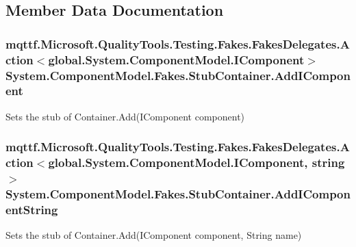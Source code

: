 \subsection{Member Data Documentation}
\hypertarget{class_system_1_1_component_model_1_1_fakes_1_1_stub_container_a74da74e37c7b42231abe4fbb2668ccfd}{
\subsubsection[{Add\-I\-Component}]{\setlength{\rightskip}{0pt plus 5cm}mqttf.\-Microsoft.\-Quality\-Tools.\-Testing.\-Fakes.\-Fakes\-Delegates.\-Action$<$global.\-System.\-Component\-Model.\-I\-Component$>$ System.\-Component\-Model.\-Fakes.\-Stub\-Container.\-Add\-I\-Component}}\label{class_system_1_1_component_model_1_1_fakes_1_1_stub_container_a74da74e37c7b42231abe4fbb2668ccfd}


Sets the stub of Container.\-Add(\-I\-Component component)

\hypertarget{class_system_1_1_component_model_1_1_fakes_1_1_stub_container_adbf5a2b9e27d72520b9c5940fd59ca5a}{
\subsubsection[{Add\-I\-Component\-String}]{\setlength{\rightskip}{0pt plus 5cm}mqttf.\-Microsoft.\-Quality\-Tools.\-Testing.\-Fakes.\-Fakes\-Delegates.\-Action$<$global.\-System.\-Component\-Model.\-I\-Component, string$>$ System.\-Component\-Model.\-Fakes.\-Stub\-Container.\-Add\-I\-Component\-String}}\label{class_system_1_1_component_model_1_1_fakes_1_1_stub_container_adbf5a2b9e27d72520b9c5940fd59ca5a}


Sets the stub of Container.\-Add(\-I\-Component component, String name)


